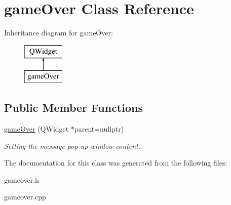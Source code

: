 \hypertarget{classgameOver}{\section{game\-Over Class Reference}
\label{classgameOver}
}
Inheritance diagram for game\-Over\-:\begin{figure}[H]
\begin{center}
\leavevmode
\includegraphics[height=2.000000cm]{classgameOver}
\end{center}
\end{figure}
\subsection*{Public Member Functions}
\begin{DoxyCompactItemize}
\item 
\hypertarget{classgameOver_a2aa791f3bc5d8899b4ee05210aafe69e}{\hyperlink{classgameOver_a2aa791f3bc5d8899b4ee05210aafe69e}{game\-Over} (Q\-Widget $\ast$parent=nullptr)}\label{classgameOver_a2aa791f3bc5d8899b4ee05210aafe69e}

\begin{DoxyCompactList}\small\item\em Setting the message pop up window content. \end{DoxyCompactList}\end{DoxyCompactItemize}


The documentation for this class was generated from the following files\-:\begin{DoxyCompactItemize}
\item 
gameover.\-h\item 
gameover.\-cpp\end{DoxyCompactItemize}
